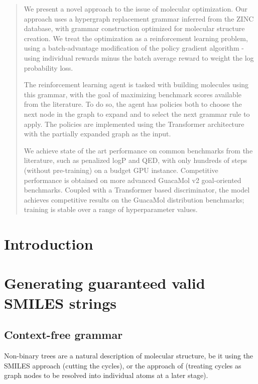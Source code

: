 \documentclass{article}
\begin{document}
\begin{abstract}
We present a novel approach to the issue of molecular optimization. Our approach uses a hypergraph replacement grammar inferred from the ZINC database, with grammar construction optimized for molecular structure creation. We treat the optimization as a reinforcement learning problem, using a batch-advantage modification of the policy gradient algorithm - using individual rewards minus the batch average reward to weight the log probability loss.
   
    The reinforcement learning agent is tasked with building molecules using this grammar, with the goal of maximizing benchmark scores available from the literature. To do so, the agent has policies both to choose the next node in the graph to expand and to select the next grammar rule to apply. The policies are implemented using the Transformer architecture with the partially expanded graph as the input.
   
    We achieve state of the art performance on common benchmarks from the literature, such as penalized logP and QED, with only hundreds of steps (without pre-training) on a budget GPU instance. Competitive performance is obtained on more advanced GuacaMol v2 goal-oriented benchmarks. Coupled with a Transformer based discriminator, the model achieves competitive results on the GuacaMol distribution benchmarks; training is stable over a range of hyperparameter values.
\end{abstract}
\section{Introduction}

\section{Generating guaranteed valid SMILES strings}\label{sec:valid_smiles}

\subsection{Context-free grammar}
Non-binary trees are a natural description of molecular structure, be it using the SMILES approach (cutting the cycles), or the approach of \cite{jin18} (treating cycles as graph nodes to be resolved into individual atoms at a later stage).
\end{document}
